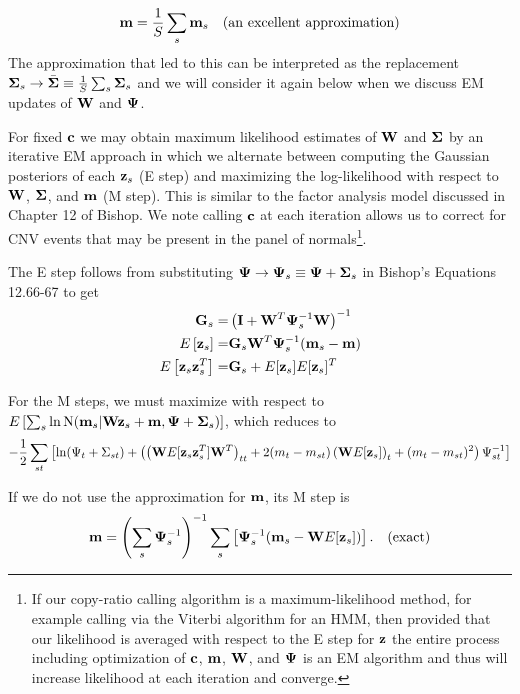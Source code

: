 \documentclass[nofootinbib,amssymb,amsmath]{revtex4}
\newcommand{\vI}{{\bf I}}
\newcommand{\vc}{{\bf c}}
\newcommand{\vz}{{\bf z}}
\newcommand{\vm}{{\bf m}}
\newcommand{\vG}{{\bf G}}
\newcommand{\vW}{{\bf W}}
\newcommand{\vPsi}{{\bf \Psi}}
\newcommand{\vSigma}{{\bf \Sigma}}
\begin{document}
\begin{equation}
\vm = \frac{1}{S} \sum_s \vm_s \quad {\rm (an~excellent~approximation)}
\end{equation}
The approximation that led to this can be interpreted as the replacement $\vSigma_s \rightarrow \bar{\vSigma} \equiv \frac{1}{S} \sum_s \vSigma_s$ and we will consider it again below when we discuss EM updates of $\vW$ and $\vPsi$.

For fixed $\vc$ we may obtain maximum likelihood estimates of $\vW$ and $\vSigma$ by an iterative EM approach in which we alternate between computing the Gaussian posteriors of each $\vz_s$ (E step) and maximizing the log-likelihood with respect to $\vW$, $\vSigma$, and $\vm$ (M step).  This is similar to the factor analysis model discussed in Chapter 12 of Bishop.  We note calling $\vc$ at each iteration allows us to correct for CNV events that may be present in the panel of normals\footnote{If our copy-ratio calling algorithm is a maximum-likelihood method, for example calling via the Viterbi algorithm for an HMM, then provided that our likelihood is averaged with respect to the E step for $\vz$ the entire process including optimization of $\vc$, $\vm$, $\vW$, and $\vPsi$ is an EM algorithm and thus will increase likelihood at each iteration and converge.}.

The E step follows from substituting $\vPsi \rightarrow \vPsi_s \equiv  \vPsi + \vSigma_s$ in Bishop's Equations 12.66-67 to get
%
\begin{align}
\vG_s =& \left( \vI + \vW^T \vPsi_s^{-1} \vW \right)^{-1} \\
E \left[ \vz_s \right] =& \vG_s \vW^T \vPsi_s^{-1} (\vm_s - \vm) \\
E \left[ \vz_s \vz_s^T \right] =& \vG_s + E[\vz_s] E[\vz_s]^T
\end{align}
%

For the M steps, we must maximize with respect to $E \left[ \sum_s \ln {\rm N}(\vm_s | \vW \vz_s + \vm, \vPsi + \vSigma_s) \right]$, which reduces to
%
\begin{equation}
 -\frac{1}{2} \sum_{st} \left[ \ln (\Psi_t + \Sigma_{st}) + \left(  \left( \vW E[\vz_s \vz_s^T] \vW^T \right)_{tt} +2 (m_t - m_{st}) \left( \vW E[\vz_s] \right)_t + (m_t - m_{st})^2 \right)\Psi_{st}^{-1} \right]
\end{equation}
%

If we do not use the approximation for $\vm$, its M step is
\begin{align}
\vm = \left( \sum_s \vPsi_{s}^{-1} \right)^{-1} \sum_s \left[ \vPsi_{s}^{-1}  (\vm_{s}  - \vW  E[\vz_{s}] ) \right]. \quad {\rm (exact)}
\end{align}
\end{document}
